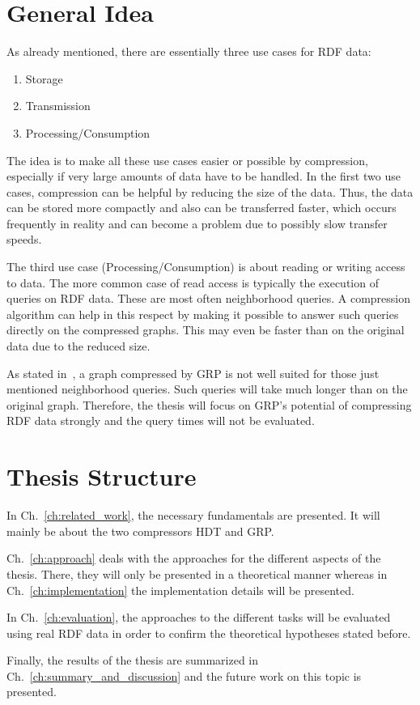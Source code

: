 \pagebreak
\section{General Idea}

As already mentioned, there are essentially three use cases for RDF data:

\begin{enumerate}
	\item Storage
	\item Transmission
	\item Processing/Consumption
\end{enumerate}

The idea is to make all these use cases easier or possible by compression, especially if very large amounts of data have to be handled. In the first two use cases, compression can be helpful by reducing the size of the data. Thus, the data can be stored more compactly and also can be transferred faster, which occurs frequently in reality and can become a problem due to possibly slow transfer speeds.

The third use case (Processing/Consumption) is about reading or writing access to data. The more common case of read access is typically the execution of queries on RDF data. These are most often neighborhood queries. A compression algorithm can help in this respect by making it possible to answer such queries directly on the compressed graphs. This may even be faster than on the original data due to the reduced size.

As stated in~\cite{maneth}, a graph compressed by GRP is not well suited for those just mentioned neighborhood queries. Such queries will take much longer than on the original graph. Therefore, the thesis will focus on GRP's potential of compressing RDF data strongly and the query times will not be evaluated.



\section{Thesis Structure}

In Ch.~\ref{ch:related_work}, the necessary fundamentals are presented. It will mainly be about the two compressors HDT and GRP. 

Ch.~\ref{ch:approach} deals with the approaches for the different aspects of the thesis. There, they will only be presented in a theoretical manner whereas in Ch.~\ref{ch:implementation} the implementation details will be presented.

In Ch.~\ref{ch:evaluation}, the approaches to the different tasks will be evaluated using real RDF data in order to confirm the theoretical hypotheses stated before.

Finally, the results of the thesis are summarized in Ch.~\ref{ch:summary_and_discussion} and the future work on this topic is presented.








